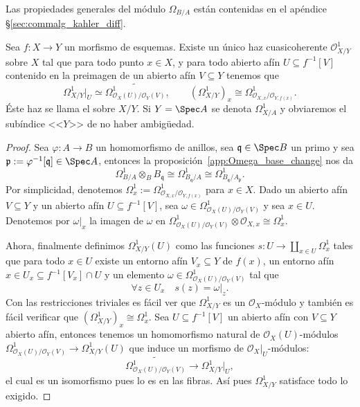 Las propiedades generales del módulo $\Omega_{B/A}$ están contenidas en el apéndice \S\ref{sec:commalg_kahler_diff}.
\begin{prop}
	Sea $f \colon X \to Y$ un morfismo de esquemas.
	Existe un único haz cuasicoherente $\mathscr{O}_{X/Y}^1$ sobre $X$ tal que para todo punto $x \in X$,
	y para todo abierto afín $U \subseteq f^{-1}[V]$ contenido en la preimagen de un abierto afín $V \subseteq Y$ tenemos que
	$$ \Omega_{X/Y}^1 |_U \simeq \widetilde{ \Omega^1_{ {\mathscr{O}}_X(U) / {\mathscr{O}}_Y(V) } }, \qquad
	( \Omega_{X/Y}^1 )_x \cong \Omega_{\mathscr{O}_{X, x} / \mathscr{O}_{Y, f(x)}}^1. $$
	Éste haz se llama el  sobre $X/Y$.
	Si $Y = \Spec A$ se denota $\Omega_{X/A}^1$ y obviaremos el subíndice <<$Y$>> de no haber ambigüedad.
\end{prop}
\begin{proof}
	Sea $\varphi \colon A \to B$ un homomorfismo de anillos, sea $\mathfrak{q} \in \Spec B$ un primo y sea $\mathfrak{p} := \varphi^{-1}[\mathfrak{q}] \in
	\Spec A$, entonces la proposición~\ref{app:Omega_base_change} nos da
	$$ \Omega_{B/A}^1 \otimes_B B_{\mathfrak{q}} \cong \Omega_{B_{\mathfrak{q}}/A}^1 \cong \Omega_{B_{\mathfrak{q}} / A_{\mathfrak{p}}}^1. $$
	Por simplicidad, denotemos $\Omega_x^1 := \Omega_{\mathscr{O}_{X, x} / \mathscr{O}_{Y, f(x)}}^1$ para $x \in X$.
	Dado un abierto afín $V \subseteq Y$ y un abierto afín $U \subseteq f^{-1}[V]$, sea $\omega \in \Omega_{\mathscr{O}_X(U) / \mathscr{O}_Y(V)}^1$ y
	sea $x \in U$.
	Denotemos por $\omega|_x$ la imagen de $\omega$ en $\Omega_{\mathscr{O}_X(U) / \mathscr{O}_Y(V)}^1 \otimes \mathscr{O}_{X, x} \cong \Omega_x^1$.

	Ahora, finalmente definimos $\Omega_{X/Y}^1(U)$ como las funciones $s \colon U \to \coprod_{x\in U} \Omega_x^1$ tales que para todo $x \in U$
	existe un entorno afín $V_x \subseteq Y$ de $f(x)$, un entorno afín $x \in U_x \subseteq f^{-1}[V_x] \cap U$ y un elemento $\omega
	\in \Omega_{\mathscr{O}_X(U) / \mathscr{O}_Y(V)}^1$ tal que
	$$ \forall z \in U_x \quad s(z) = \omega|_z. $$
	Con las restricciones triviales es fácil ver que $\Omega_{X/Y}^1$ es un $\mathscr{O}_X$-módulo y también es fácil verificar que
	$( \Omega_{X/Y}^1 )_x \cong \Omega_x^1$.
	Sea $U \subseteq f^{-1}[V]$ un abierto afín con $V \subseteq Y$ abierto afín, entonces tenemos un homomorfismo natural de $\mathscr{O}_X(U)$-módulos
	$\Omega_{\mathscr{O}_X(U) / \mathscr{O}_Y(V)}^1 \to \Omega_{X/Y}^1(U)$ que induce un morfismo de $\mathscr{O}_X|_U$-módulos:
	\[
		\widetilde{ \Omega^1_{ {\mathscr{O}}_X(U) / {\mathscr{O}}_Y(V) } } \longrightarrow \Omega_{X/Y}^1|_U,
	\]
	el cual es un isomorfismo pues lo es en las fibras.
	Así pues $\Omega_{X/Y}^1$ satisface todo lo exigido.
\end{proof}

